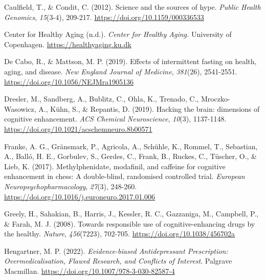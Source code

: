 \documentclass[authordate, empirical]{jote-new-article}
\begin{document}
Caulfield, T., \& Condit, C. (2012). Science and the sources of hype. \emph{Public Health Genomics}, \emph{15}(3-4), 209-217. \url{https://doi.org/10.1159/000336533}







Center for Healthy Aging (n.d.). \emph{Center for Healthy Aging. }University of Copenhagen. \url{https://healthyaging.ku.dk}







De Cabo, R., \& Mattson, M. P. (2019). Effects of intermittent fasting on health, aging, and disease. \emph{New England Journal of Medicine}, \emph{381}(26), 2541-2551. \url{https://doi.org/10.1056/NEJMra1905136}







Dresler, M., Sandberg, A., Bublitz, C., Ohla, K., Trenado, C., Mroczko-Wasowicz, A., Kühn, S., \& Repantis, D. (2019). Hacking the brain: dimensions of cognitive enhancement. \emph{ACS Chemical Neuroscience}, \emph{10}(3), 1137-1148. \url{https://doi.org/10.1021/acschemneuro.8b00571}







Franke, A. G., Gränsmark, P., Agricola, A., Schühle, K., Rommel, T., Sebastian, A., Balló, H. E., Gorbulev, S., Gerdes, C., Frank, B., Ruckes, C., Tüscher, O., \& Lieb, K. (2017). Methylphenidate, modafinil, and caffeine for cognitive enhancement in chess: A double-blind, randomised controlled trial. \emph{European Neuropsychopharmacology}, \emph{27}(3), 248-260. \url{https://doi.org/10.1016/j.euroneuro.2017.01.006}







Greely, H., Sahakian, B., Harris, J., Kessler, R. C., Gazzaniga, M., Campbell, P., \& Farah, M. J. (2008). Towards responsible use of cognitive-enhancing drugs by the healthy. \emph{Nature}, \emph{456}(7223), 702-705. \url{https://doi.org/10.1038/456702a}







Hengartner, M. P. (2022). \emph{Evidence-biased Antidepressant Prescription: }\emph{Overmedicalisation}\emph{, Flawed Research, and Conflicts of Interest}. Palgrave Macmillan. \url{https://doi.org/10.1007/978-3-030-82587-4}
\end{document}
